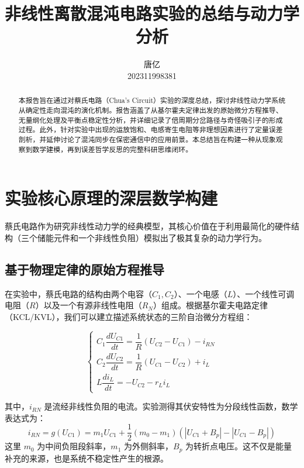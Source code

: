 \documentclass[12pt,a4paper]{article}
\begin{document}
%

\title{非线性离散混沌电路实验的总结与动力学分析}
\author{唐亿\\202311998381}

\maketitle
\begin{abstract}
    本报告旨在通过对蔡氏电路（Chua's Circuit）实验的深度总结，探讨非线性动力学系统从确定性走向混沌的演化机制。报告涵盖了从基尔霍夫定律出发的原始微分方程推导、无量纲化处理及平衡点稳定性分析，并详细记录了倍周期分岔路径与奇怪吸引子的形成过程。此外，针对实验中出现的运放饱和、电感寄生电阻等非理想因素进行了定量误差剖析，并延伸讨论了混沌同步在保密通信中的应用前景。本总结旨在构建一种从现象观察到数学建模，再到误差哲学反思的完整科研思维闭环。
\end{abstract}

\vspace{1em}

\section{实验核心原理的深层数学构建}

蔡氏电路作为研究非线性动力学的经典模型，其核心价值在于利用最简化的硬件结构（三个储能元件和一个非线性负阻）模拟出了极其复杂的动力学行为。

\subsection{基于物理定律的原始方程推导}
在实验中，蔡氏电路的结构由两个电容（$C_1, C_2$）、一个电感（$L$）、一个线性可调电阻（$R$）以及一个有源非线性电阻（$R_N$）组成。根据基尔霍夫电路定律（KCL/KVL），我们可以建立描述系统状态的三阶自治微分方程组：



\begin{equation}
\begin{cases}
C_1 \dfrac{d U_{C1}}{dt} = \dfrac{1}{R}(U_{C2} - U_{C1}) - i_{RN} \\[3mm]
C_2 \dfrac{d U_{C2}}{dt} = \dfrac{1}{R}(U_{C1} - U_{C2}) + i_L \\[3mm]
L \dfrac{d i_L}{dt} = -U_{C2} - r_L i_L
\end{cases}
\end{equation}

其中，$i_{RN}$ 是流经非线性负阻的电流。实验测得其伏安特性为分段线性函数，数学表达式为：
\begin{equation}
i_{RN} = g(U_{C1}) = m_1 U_{C1} + \frac{1}{2}(m_0 - m_1)(|U_{C1} + B_p| - |U_{C1} - B_p|)
\end{equation}
这里 $m_0$ 为中间负阻段斜率，$m_1$ 为外侧斜率，$B_p$ 为转折点电压。这不仅是能量补充的来源，也是系统不稳定性产生的根源。
\end{document}

